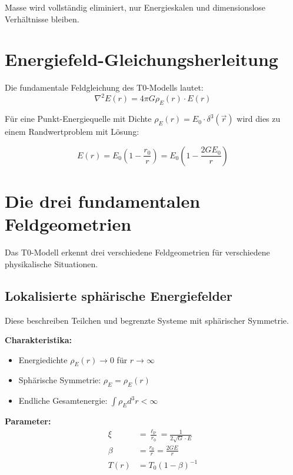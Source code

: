 \documentclass[12pt,a4paper]{report}
\newcommand{\lP}{\ell_{\text{P}}}         %
\newcommand{\rzero}{r_0}                  %
\begin{document}
	Masse wird vollständig eliminiert, nur Energieskalen und dimensionslose Verhältnisse bleiben.
	
	\section{Energiefeld-Gleichungsherleitung}
	\label{sec:energy_field_equation}
	
	Die fundamentale Feldgleichung des T0-Modells lautet:
	\begin{equation}
		\nabla^2 E(r) = 4\pi G \rho_E(r) \cdot E(r)
		\label{eq:t0_field_equation_energy}
	\end{equation}
	
	Für eine Punkt-Energiequelle mit Dichte $\rho_E(r) = E_0 \cdot \delta^3(\vec{r})$ wird dies zu einem Randwertproblem mit Lösung:
	
	\begin{equation}
		\boxed{E(r) = E_0\left(1 - \frac{\rzero}{r}\right) = E_0\left(1 - \frac{2GE_0}{r}\right)}
		\label{eq:complete_energy_solution}
	\end{equation}
	
	\section{Die drei fundamentalen Feldgeometrien}
	\label{sec:three_field_geometries}
	
	Das T0-Modell erkennt drei verschiedene Feldgeometrien für verschiedene physikalische Situationen.
	
	\subsection{Lokalisierte sphärische Energiefelder}
	\label{subsec:localized_spherical}
	
	Diese beschreiben Teilchen und begrenzte Systeme mit sphärischer Symmetrie.
	
	\textbf{Charakteristika:}
	\begin{itemize}
		\item Energiedichte $\rho_E(r) \to 0$ für $r \to \infty$
		\item Sphärische Symmetrie: $\rho_E = \rho_E(r)$
		\item Endliche Gesamtenergie: $\int \rho_E d^3r < \infty$
	\end{itemize}
	
	\textbf{Parameter:}
	\begin{align}
		\xi &= \frac{\lP}{\rzero} = \frac{1}{2\sqrt{G} \cdot E} \\
		\beta &= \frac{\rzero}{r} = \frac{2GE}{r} \\
		T(r) &= T_0(1 - \beta)^{-1}
	\end{align}
	
\end{document}
